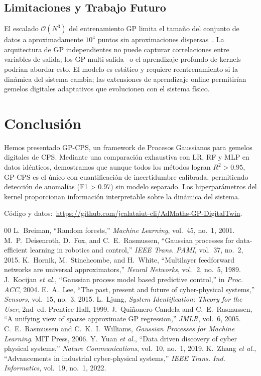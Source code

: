 \documentclass[conference]{IEEEtran}
\begin{document}
\subsection{Limitaciones y Trabajo Futuro}
El escalado $\mathcal{O}(N^3)$ del entrenamiento GP limita el tamaño del conjunto de datos a aproximadamente $10^4$ puntos sin aproximaciones dispersas~\cite{quinonero2005}. La arquitectura de GP independientes no puede capturar correlaciones entre variables de salida; los GP multi-salida~\cite{alvarez2012} o el aprendizaje profundo de kernels~\cite{wilson2016} podrían abordar esto. El modelo es estático y requiere reentrenamiento si la dinámica del sistema cambia; las extensiones de aprendizaje online permitirían gemelos digitales adaptativos que evolucionen con el sistema físico.

\section{Conclusión}
\label{sec:conclusion}

Hemos presentado GP-CPS, un framework de Procesos Gaussianos para gemelos digitales de CPS. Mediante una comparación exhaustiva con LR, RF y MLP en datos idénticos, demostramos que aunque todos los métodos logran $R^2 > 0.95$, GP-CPS es el único con cuantificación de incertidumbre calibrada, permitiendo detección de anomalías (F1 > 0.97) sin modelo separado. Los hiperparámetros del kernel proporcionan información interpretable sobre la dinámica del sistema.

Código y datos:~\url{https://github.com/jcalataiut-cli/AdMaths-GP-DigitalTwin}.

\begin{thebibliography}{00}
 L.~Breiman, ``Random forests,'' \textit{Machine Learning}, vol.~45, no.~1, 2001.
 M.~P.~Deisenroth, D.~Fox, and C.~E.~Rasmussen, ``Gaussian processes for data-efficient learning in robotics and control,'' \textit{IEEE Trans. PAMI}, vol.~37, no.~2, 2015.
 K.~Hornik, M.~Stinchcombe, and H.~White, ``Multilayer feedforward networks are universal approximators,'' \textit{Neural Networks}, vol.~2, no.~5, 1989.
 J.~Kocijan \textit{et al.}, ``Gaussian process model based predictive control,'' in \textit{Proc. ACC}, 2004.
 E.~A.~Lee, ``The past, present and future of cyber-physical systems,'' \textit{Sensors}, vol.~15, no.~3, 2015.
 L.~Ljung, \textit{System Identification: Theory for the User}, 2nd~ed. Prentice Hall, 1999.
 J.~Qui\~nonero-Candela and C.~E.~Rasmussen, ``A unifying view of sparse approximate GP regression,'' \textit{JMLR}, vol.~6, 2005.
 C.~E.~Rasmussen and C.~K.~I.~Williams, \textit{Gaussian Processes for Machine Learning}. MIT Press, 2006.
 Y.~Yuan \textit{et al.}, ``Data driven discovery of cyber physical systems,'' \textit{Nature Communications}, vol.~10, no.~1, 2019.
 K.~Zhang \textit{et al.}, ``Advancements in industrial cyber-physical systems,'' \textit{IEEE Trans. Ind. Informatics}, vol.~19, no.~1, 2022.
\end{thebibliography}
\end{document}
